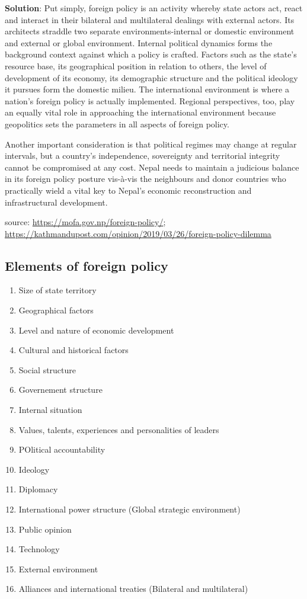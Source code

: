 \documentclass[
  openany]{book}
\providecommand{\tightlist}{%
  \setlength{\itemsep}{0pt}\setlength{\parskip}{0pt}}
\newenvironment{solution}{ {\bfseries Solution}:}{}
\begin{document}
\begin{questions}
\begin{solution}
Put simply, foreign policy is an activity whereby state actors act, react and interact in their bilateral and multilateral dealings with external actors. Its architects straddle two separate environments-internal or domestic environment and external or global environment. Internal political dynamics forms the background context against which a policy is crafted. Factors such as the state's resource base, its geographical position in relation to others, the level of development of its economy, its demographic structure and the political ideology it pursues form the domestic milieu. The international environment is where a nation's foreign policy is actually implemented. Regional perspectives, too, play an equally vital role in approaching the international environment because geopolitics sets the parameters in all aspects of foreign policy. 

Another important consideration is that political regimes may change at regular intervals, but a country’s independence, sovereignty and territorial integrity cannot be compromised at any cost. Nepal needs to maintain a judicious balance in its foreign policy posture vis-à-vis the neighbours and donor countries who practically wield a vital key to Nepal’s economic reconstruction and infrastructural development.

source: \url{https://mofa.gov.np/foreign-policy/}; \url{https://kathmandupost.com/opinion/2019/03/26/foreign-policy-dilemma}
\end{solution}
\end{questions}

\hypertarget{elements-of-foreign-policy}{%
\subsection{Elements of foreign policy}\label{elements-of-foreign-policy}}

\begin{enumerate}
\def\labelenumi{\arabic{enumi}.}
\tightlist
\item
  Size of state territory
\item
  Geographical factors
\item
  Level and nature of economic development
\item
  Cultural and historical factors
\item
  Social structure
\item
  Governement structure
\item
  Internal situation
\item
  Values, talents, experiences and personalities of leaders
\item
  POlitical accountability
\item
  Ideology
\item
  Diplomacy
\item
  International power structure (Global strategic environment)
\item
  Public opinion
\item
  Technology
\item
  External environment
\item
  Alliances and international treaties (Bilateral and multilateral)
\end{enumerate}
\end{document}
